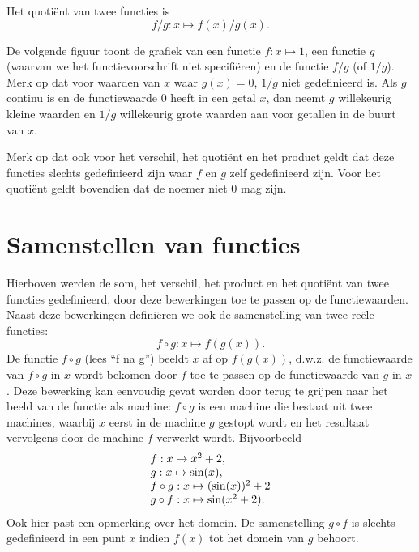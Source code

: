 Het quoti\"ent van twee functies is
\[
f/g:x\mapsto f(x)/g(x).
\]

\newpage



De volgende figuur toont de grafiek van een functie $f:x\mapsto 1$,
een functie $g$ (waarvan we het functievoorschrift niet specifi\"eren) en de functie $f/g$ (of $1/g$). Merk op dat voor
waarden van $x$ waar $g(x)=0$, $1/g$ niet gedefinieerd is. Als $g$
continu is en de functiewaarde $0$ heeft in een getal $x$, dan neemt $g$
willekeurig kleine waarden en $1/g$ willekeurig grote waarden aan voor
getallen in de buurt van $x$.

\begin{center}
\end{center}

Merk op dat ook voor het verschil, het quoti\"ent en het product geldt
dat deze functies slechts gedefinieerd zijn waar $f$ en $g$ zelf
gedefinieerd zijn. Voor het quoti\"ent geldt bovendien dat de noemer
niet $0$ mag zijn.


\section{Samenstellen van functies}
\label{secsam}

Hierboven werden de som, het verschil, het product en het quoti\"ent van
twee functies gedefinieerd, door deze bewerkingen toe te passen op de
functiewaarden. Naast deze bewerkingen defini\"eren we ook de
samenstelling van twee re\"ele functies:
\[
f\circ g:x\mapsto f(g(x)).
\]
De functie $f\circ g$ (lees ``f na g'') beeldt $x$ af
op $f(g(x))$, d.w.z. de functiewaarde van $f\circ g$ in $x$ wordt
bekomen door $f$ toe te passen op de functiewaarde van $g$ in $x$.
Deze bewerking kan eenvoudig gevat worden door terug te grijpen
naar het beeld van de functie als machine: $f\circ g$ is een machine
die bestaat uit twee machines, waarbij $x$ eerst in de machine $g$
gestopt wordt en het resultaat vervolgens door de machine $f$ verwerkt
wordt. Bijvoorbeeld
\[
\ba{l}
f:x\mapsto x^2+2,\\
g:x\mapsto \sin(x),\\
f\circ g:x\mapsto (\sin(x))^2+2\\
g\circ f:x\mapsto \sin(x^2+2).
\ea
\]
Ook hier past een opmerking over het domein. De samenstelling $g\circ
f$ is slechts gedefinieerd in een punt $x$ indien $f(x)$ tot het
domein van $g$ behoort.

